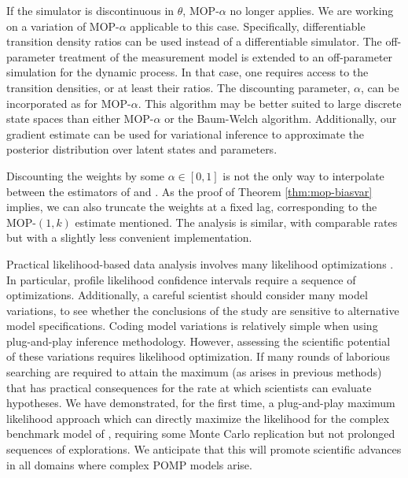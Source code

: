 \documentclass[9pt,twocolumn,pnasresearcharticle]{pnas-new}
\begin{document}
If the simulator is discontinuous in $\theta$, MOP-$\alpha$ no longer applies.
We are working on a variation of MOP-$\alpha$ applicable to this case.
Specifically, differentiable transition density ratios can be used instead of a differentiable simulator.
The off-parameter treatment of the measurement model is extended to an off-parameter simulation for the dynamic process.
In that case, one requires access to the transition densities, or at least their ratios. 
The discounting parameter, $\alpha$, can be incorporated as for MOP-$\alpha$.
This algorithm may be better suited to large discrete state spaces than either MOP-$\alpha$ or the Baum-Welch algorithm.
Additionally, our gradient estimate can be used for variational inference to approximate the posterior distribution over latent states \cite{naesseth18} and parameters. 

Discounting the weights by some $\alpha \in [0,1]$ is not the only way to interpolate between the estimators of \cite{naesseth18} and \cite{poyiadjis11}. 
As the proof of Theorem \ref{thm:mop-biasvar} implies, we can also truncate the weights at a fixed lag, corresponding to the MOP-$(1,k)$ estimate mentioned. 
The analysis is similar, with comparable rates but with a slightly less convenient implementation. 

Practical likelihood-based data analysis involves many likelihood optimizations \cite{king08,blake14,pons-salort18,subramanian21,fox22,drake23}.
In particular, profile likelihood confidence intervals require a sequence of optimizations.
Additionally, a careful scientist should consider many model variations, to see whether the conclusions of the study are sensitive to alternative model specifications.
Coding model variations is relatively simple when using plug-and-play inference methodology.
However, assessing the scientific potential of these variations requires likelihood optimization.
If many rounds of laborious searching are required to attain the maximum (as arises in previous methods) that has practical consequences for the rate at which scientists can evaluate hypotheses.
We have demonstrated, for the first time, a plug-and-play maximum likelihood approach which can directly maximize the likelihood for the complex benchmark model of \cite{king08}, requiring some Monte Carlo replication but not prolonged sequences of explorations.
We anticipate that this will promote scientific advances in all domains where complex POMP models arise.
\end{document}
